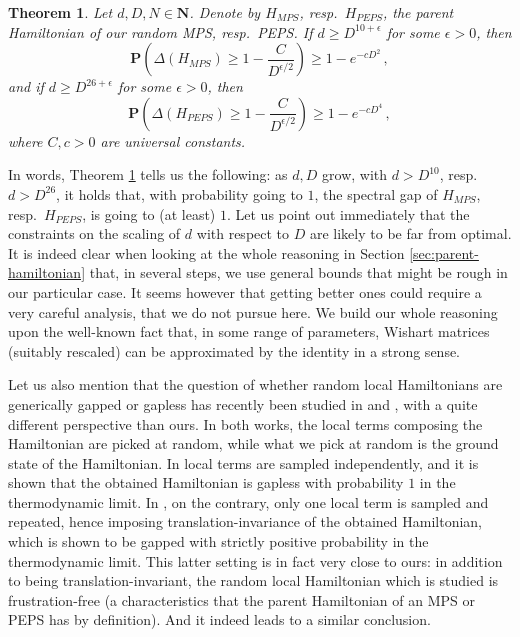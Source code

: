 \documentclass{amsart}
\newtheorem{theorem}{Theorem}[section]
\newcommand{\N}{\mathbf{N}}
\renewcommand{\P}{\mathbf{P}}
\renewcommand{\geq}{\geqslant}
\begin{document}
\begin{theorem} \label{th:gap-H-summary}
    Let $d,D,N\in\N$. Denote by $H_{MPS}$, resp.~$H_{PEPS}$, the parent Hamiltonian of our random MPS, resp.~PEPS. If $d\geq D^{10+\epsilon}$ for some $\epsilon>0$, then
    \[ \P \left( \Delta\left(H_{MPS}\right) \geq 1-\frac{C}{D^{\epsilon/2}} \right) \geq 1-e^{-cD^2} \, , \]
    and if $d\geq D^{26+\epsilon}$ for some $\epsilon>0$, then
    \[ \P \left( \Delta\left(H_{PEPS}\right) \geq 1-\frac{C}{D^{\epsilon/2}} \right) \geq 1-e^{-cD^4} \, , \]
    where $C,c>0$ are universal constants.
\end{theorem}

In words, Theorem \ref{th:gap-H-summary} tells us the following: as $d,D$ grow, with $d>D^{10}$, resp.~$d>D^{26}$, it holds that, with probability going to $1$, the spectral gap of $H_{MPS}$, resp.~$H_{PEPS}$, is going to (at least) $1$. Let us point out immediately that the constraints on the scaling of $d$ with respect to $D$ are likely to be far from optimal. It is indeed clear when looking at the whole reasoning in Section \ref{sec:parent-hamiltonian} that, in several steps, we use general bounds that might be rough in our particular case. It seems however that getting better ones could require a very careful analysis, that we do not pursue here. We build our whole reasoning upon the well-known fact that, in some range of parameters, Wishart matrices (suitably rescaled) can be approximated by the identity in a strong sense.

Let us also mention that the question of whether random local Hamiltonians are generically gapped or gapless has recently been studied in \cite{Mov} and \cite{Lem}, with a quite different perspective than ours. In both works, the local terms composing the Hamiltonian are picked at random, while what we pick at random is the ground state of the Hamiltonian. In \cite{Mov} local terms are sampled independently, and it is shown that the obtained Hamiltonian is gapless with probability $1$ in the thermodynamic limit. In \cite{Lem}, on the contrary, only one local term is sampled and repeated, hence imposing translation-invariance of the obtained Hamiltonian, which is shown to be gapped with strictly positive probability in the thermodynamic limit. This latter setting is in fact very close to ours: in addition to being translation-invariant, the random local Hamiltonian which is studied is frustration-free (a characteristics that the parent Hamiltonian of an MPS or PEPS has by definition). And it indeed leads to a similar conclusion.
\end{document}
